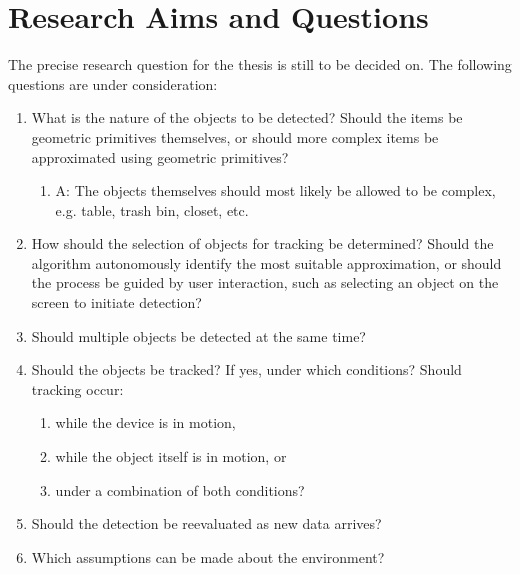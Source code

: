 


\chapter{Research Aims and Questions}

The precise research question for the thesis is still to be decided on.
The following questions are under consideration:
\begin{enumerate}
    \item What is the nature of the objects to be detected? Should the items be geometric primitives themselves, or should more complex items be approximated using geometric primitives?
    \begin{enumerate}
        \item A: The objects themselves should most likely be allowed to be complex, e.g. table, trash bin, closet, etc.
    \end{enumerate}
    \item How should the selection of objects for tracking be determined? Should the algorithm autonomously identify the most suitable approximation, or should the process be guided by user interaction, such as selecting an object on the screen to initiate detection?
    \item Should multiple objects be detected at the same time?
    \item Should the objects be tracked? If yes, under which conditions? Should tracking occur:
    \begin{enumerate}
        \item while the device is in motion,
        \item while the object itself is in motion, or
        \item under a combination of both conditions?
    \end{enumerate}
    \item Should the detection be reevaluated as new data arrives?
    \item Which assumptions can be made about the environment?
\end{enumerate}

